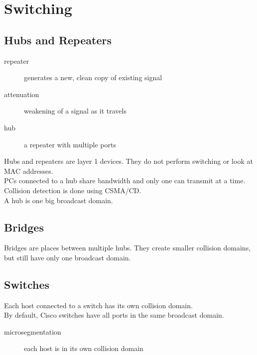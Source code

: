 \section{Switching}

\subsection{Hubs and Repeaters}

\begin{description}

\item[repeater]
generates a new, clean copy of existing signal

\item[attenuation]
weakening of a signal as it travels

\item[hub]
a repeater with multiple ports

\end{description}

Hubs and repeaters are layer 1 devices. They do not perform switching or look
at MAC addresses.\\

PCs connected to a hub share bandwidth and only one can transmit at a time.
Collision detection is done using CSMA/CD.\\

A hub is one big broadcast domain.

\subsection{Bridges}

Bridges are places between multiple hubs. They create smaller collision
domains, but still have only one broadcast domain.

\subsection{Switches}

Each host connected to a switch has its own collision domain.\\

By default, Cisco switches have all ports in the same broadcast domain.

\begin{description}

\item[microsegmentation]
each host is in its own collision domain

\end{description}

